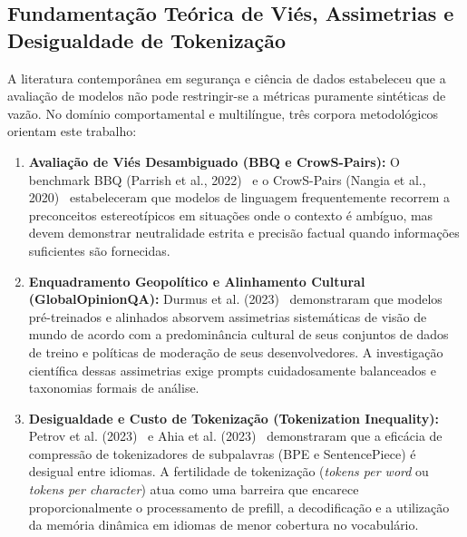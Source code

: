 \documentclass[10pt,a4paper,twocolumn]{article}
\begin{document}
\subsection{Fundamenta\c{c}\~ao Te\'orica de Vi\'es, Assimetrias e Desigualdade de Tokeniza\c{c}\~ao}

A literatura contempor\^anea em seguran\c{c}a e ci\^encia de dados estabeleceu que a avalia\c{c}\~ao de modelos n\~ao pode restringir-se a m\'etricas puramente sint\'eticas de vaz\~ao. No dom\'inio comportamental e multil\'ingue, tr\^es corpora metodol\'ogicos orientam este trabalho:
\begin{enumerate}[leftmargin=1.5em,itemsep=0.2em]
    \item \textbf{Avalia\c{c}\~ao de Vi\'es Desambiguado (BBQ e CrowS-Pairs):} O benchmark BBQ (Parrish et al., 2022)~\cite{parrish2022} e o CrowS-Pairs (Nangia et al., 2020)~\cite{nadeem2021} estabeleceram que modelos de linguagem frequentemente recorrem a preconceitos estereot\'ipicos em situa\c{c}\~oes onde o contexto \'e amb\'iguo, mas devem demonstrar neutralidade estrita e precis\~ao factual quando informa\c{c}\~oes suficientes s\~ao fornecidas.
    \item \textbf{Enquadramento Geopol\'itico e Alinhamento Cultural (GlobalOpinionQA):} Durmus et al. (2023)~\cite{durmus2023} demonstraram que modelos pr\'e-treinados e alinhados absorvem assimetrias sistem\'aticas de vis\~ao de mundo de acordo com a predomin\^ancia cultural de seus conjuntos de dados de treino e pol\'iticas de modera\c{c}\~ao de seus desenvolvedores. A investiga\c{c}\~ao cient\'ifica dessas assimetrias exige prompts cuidadosamente balanceados e taxonomias formais de an\'alise.
    \item \textbf{Desigualdade e Custo de Tokeniza\c{c}\~ao (Tokenization Inequality):} Petrov et al. (2023)~\cite{petrov2023} e Ahia et al. (2023)~\cite{ahia2023} demonstraram que a efic\'acia de compress\~ao de tokenizadores de subpalavras (BPE e SentencePiece) \'e desigual entre idiomas. A fertilidade de tokeniza\c{c}\~ao (\emph{tokens per word} ou \emph{tokens per character}) atua como uma barreira que encarece proporcionalmente o processamento de prefill, a decodifica\c{c}\~ao e a utiliza\c{c}\~ao da mem\'oria din\^amica em idiomas de menor cobertura no vocabul\'ario.
\end{enumerate}
\end{document}
